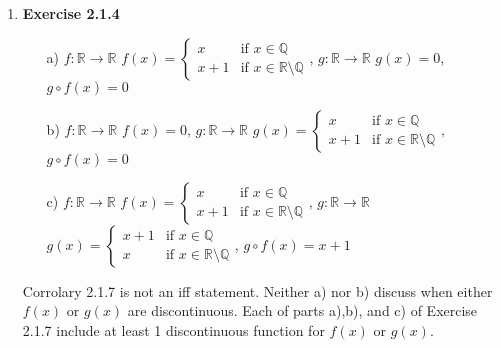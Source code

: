 \documentclass[10pt]{article}
\begin{document}
\begin{enumerate}[label=Problem \arabic*.]
    \item \textbf{Exercise 2.1.4}
    \begin{itemize}
        \item [a)] $f: \mathbb{R}\rightarrow\mathbb{R}$ $f(x)= \begin{cases}
           x & \text{if } x\in \mathbb{Q}\\
           x+1 & \text{if } x\in \mathbb{R}\setminus\mathbb{Q}
       \end{cases}$, 
        $g: \mathbb{R}\rightarrow\mathbb{R}$ $g(x)=0$, $g\circ f(x)=0$
       \item [b)] $f: \mathbb{R}\rightarrow\mathbb{R}$ $f(x)=0$, $g: \mathbb{R}\rightarrow\mathbb{R}$ $g(x)= \begin{cases}
        x & \text{if } x\in \mathbb{Q}\\
        x+1 & \text{if } x\in \mathbb{R}\setminus\mathbb{Q}
    \end{cases}$, $g\circ f(x)=0$
        \item [c)] $f: \mathbb{R}\rightarrow\mathbb{R}$ $f(x)= \begin{cases}
            x & \text{if } x\in \mathbb{Q}\\
            x+1 & \text{if } x\in \mathbb{R}\setminus\mathbb{Q}
        \end{cases}$, $g: \mathbb{R}\rightarrow\mathbb{R}$ $g(x)= \begin{cases}
            x+1 & \text{if } x\in \mathbb{Q}\\
            x & \text{if } x\in \mathbb{R}\setminus\mathbb{Q}
        \end{cases}$, $g\circ f(x)=x+1$
    \end{itemize}\par 
    Corrolary 2.1.7 is not an iff statement. Neither a) nor b) discuss when either $f(x)$ or $g(x)$ are discontinuous. Each of parts a),b), and c) of Exercise 2.1.7 include at least 1 discontinuous function for $f(x)$ or $g(x)$.
\end{enumerate}
\end{document}
